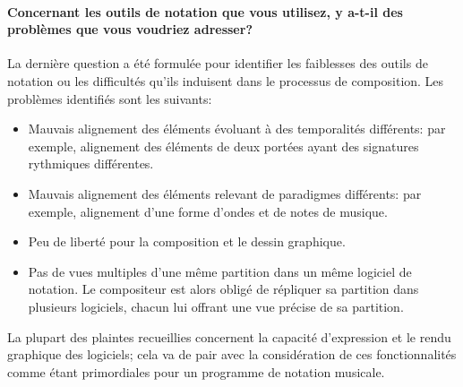 \paragraph{Concernant les outils de notation que vous utilisez, y a-t-il des problèmes que vous voudriez adresser?} La dernière question a été formulée pour identifier les faiblesses des outils de notation ou les difficultés qu'ils induisent dans le processus de composition.  Les problèmes identifiés sont les suivants:
\begin{itemize}[label=--]
	\item Mauvais alignement des éléments évoluant à des temporalités différents: par exemple, alignement des éléments de deux portées ayant des signatures rythmiques différentes.
	\item Mauvais alignement des éléments relevant de paradigmes différents: par exemple, alignement d'une forme d'ondes et de notes de musique.
	\item Peu de liberté pour la composition et le dessin graphique.
	\item Pas de vues multiples d'une même partition dans un même logiciel de notation. Le compositeur est alors obligé de répliquer sa partition dans plusieurs logiciels, chacun lui offrant une vue précise de sa partition.
\end{itemize}

La plupart des plaintes recueillies concernent la capacité d'expression et le rendu graphique des logiciels; cela va de pair avec la considération de ces fonctionnalités comme étant primordiales pour un programme de notation musicale.